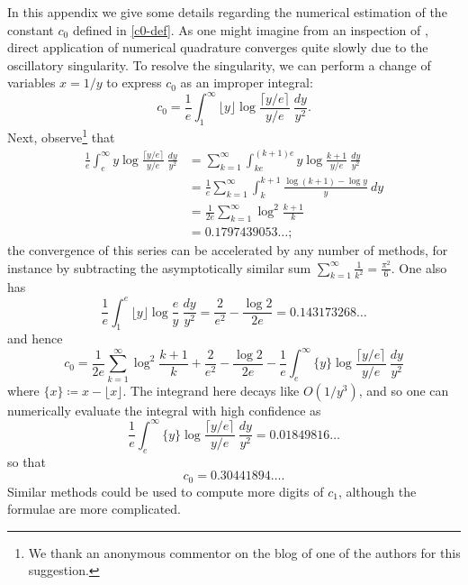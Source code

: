 \documentclass[12pt,a4paper,reqno]{amsart}
\numberwithin{equation}{section}
\theoremstyle{plain}
\theoremstyle{definition}
\begin{document}
In this appendix we give some details regarding the numerical estimation of the constant $c_0$ defined in \eqref{c0-def}.  As one might imagine from an inspection of , direct application of numerical quadrature converges quite slowly due to the oscillatory singularity.  To resolve the singularity, we can perform a change of variables $x=1/y$ to express $c_0$ as an improper integral:
\begin{equation}\label{c0-alt}
   c_0 = \frac{1}{e} \int_1^\infty \lfloor y \rfloor \log \frac{\lceil y/e \rceil}{y/e}\ \frac{dy}{y^2}.
\end{equation}
Next, observe\footnote{We thank an anonymous commentor on the blog of one of the authors for this suggestion.} that
\begin{align*}
  \frac{1}{e} \int_e^\infty y \log \frac{\lceil y/e \rceil}{y/e}\ \frac{dy}{y^2}
  &= \sum_{k=1}^\infty \int_{ke}^{(k+1)e} y \log \frac{k+1}{y/e}\ \frac{dy}{y^2} \\
  &= \frac{1}{e} \sum_{k=1}^\infty \int_k^{k+1} \frac{\log(k+1)-\log y}{y}\ dy\\
  &= \frac{1}{2e} \sum_{k=1}^\infty \log^2 \frac{k+1}{k}\\
  &= 0.1797439053\dots;
\end{align*}
the convergence of this series can be accelerated by any number of methods, for instance by subtracting the asymptotically similar sum $\sum_{k=1}^\infty \frac{1}{k^2} = \frac{\pi^2}{6}$.  One also has
$$ \frac{1}{e} \int_1^e \lfloor y \rfloor \log \frac{e}{y}\ \frac{dy}{y^2} = \frac{2}{e^2} - \frac{\log 2}{2e} = 0.143173268\dots$$
and hence
$$ c_0 = \frac{1}{2e} \sum_{k=1}^\infty \log^2 \frac{k+1}{k}
+ \frac{2}{e^2} - \frac{\log 2}{2e} - \frac{1}{e} \int_e^\infty \{y\} \log \frac{\lceil y/e \rceil}{y/e}\ \frac{dy}{y^2}$$
where $\{x\} \coloneqq x - \lfloor x \rfloor$.  The integrand here decays like $O(1/y^3)$, and so one can numerically evaluate the integral with high confidence as
$$ \frac{1}{e} \int_e^\infty \{y\} \log \frac{\lceil y/e \rceil}{y/e}\ \frac{dy}{y^2} = 0.01849816\dots$$
so that
$$ c_0 = 0.30441894\dots.$$
Similar methods could be used to compute more digits of $c_1$, although the formulae are more complicated.
\end{document}
